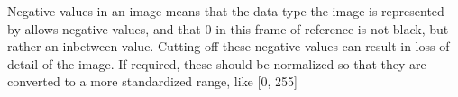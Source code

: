 Negative values in an image means that the data type the image is represented by allows negative values, and that 0 in this frame of reference is not black, but rather an inbetween value. Cutting off these negative values can result in loss of detail of the image. If required, these should be normalized so that they are converted to a more standardized range, like [0, 255]